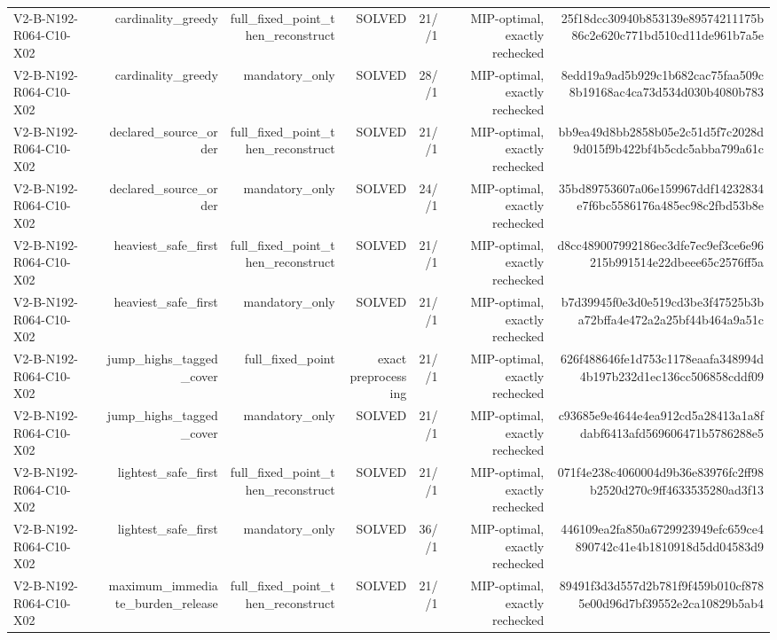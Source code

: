 {\begin{longtable}{lrrrrrr}
V2-B-N192-R064-C10-X02 & cardinality\_greedy & full\_fixed\_point\_then\_reconstruct & SOLVED & 21//1 & MIP-optimal, exactly rechecked & 25f18dcc30940b853139e89574211175b86c2e620c771bd510cd11de961b7a5e \\
V2-B-N192-R064-C10-X02 & cardinality\_greedy & mandatory\_only & SOLVED & 28//1 & MIP-optimal, exactly rechecked & 8edd19a9ad5b929c1b682cac75faa509c8b19168ac4ca73d534d030b4080b783 \\
V2-B-N192-R064-C10-X02 & declared\_source\_order & full\_fixed\_point\_then\_reconstruct & SOLVED & 21//1 & MIP-optimal, exactly rechecked & bb9ea49d8bb2858b05e2c51d5f7c2028d9d015f9b422bf4b5cdc5abba799a61c \\
V2-B-N192-R064-C10-X02 & declared\_source\_order & mandatory\_only & SOLVED & 24//1 & MIP-optimal, exactly rechecked & 35bd89753607a06e159967ddf14232834e7f6bc5586176a485ec98c2fbd53b8e \\
V2-B-N192-R064-C10-X02 & heaviest\_safe\_first & full\_fixed\_point\_then\_reconstruct & SOLVED & 21//1 & MIP-optimal, exactly rechecked & d8cc489007992186ec3dfe7ec9ef3ce6e96215b991514e22dbeee65c2576ff5a \\
V2-B-N192-R064-C10-X02 & heaviest\_safe\_first & mandatory\_only & SOLVED & 21//1 & MIP-optimal, exactly rechecked & b7d39945f0e3d0e519cd3be3f47525b3ba72bffa4e472a2a25bf44b464a9a51c \\
V2-B-N192-R064-C10-X02 & jump\_highs\_tagged\_cover & full\_fixed\_point & exact preprocessing & 21//1 & MIP-optimal, exactly rechecked & 626f488646fe1d753c1178eaafa348994d4b197b232d1ec136cc506858cddf09 \\
V2-B-N192-R064-C10-X02 & jump\_highs\_tagged\_cover & mandatory\_only & SOLVED & 21//1 & MIP-optimal, exactly rechecked & c93685e9e4644e4ea912cd5a28413a1a8fdabf6413afd569606471b5786288e5 \\
V2-B-N192-R064-C10-X02 & lightest\_safe\_first & full\_fixed\_point\_then\_reconstruct & SOLVED & 21//1 & MIP-optimal, exactly rechecked & 071f4e238c4060004d9b36e83976fc2ff98b2520d270c9ff4633535280ad3f13 \\
V2-B-N192-R064-C10-X02 & lightest\_safe\_first & mandatory\_only & SOLVED & 36//1 & MIP-optimal, exactly rechecked & 446109ea2fa850a6729923949efc659ce4890742c41e4b1810918d5dd04583d9 \\
V2-B-N192-R064-C10-X02 & maximum\_immediate\_burden\_release & full\_fixed\_point\_then\_reconstruct & SOLVED & 21//1 & MIP-optimal, exactly rechecked & 89491f3d3d557d2b781f9f459b010cf8785e00d96d7bf39552e2ca10829b5ab4 \\

\end{longtable}}
